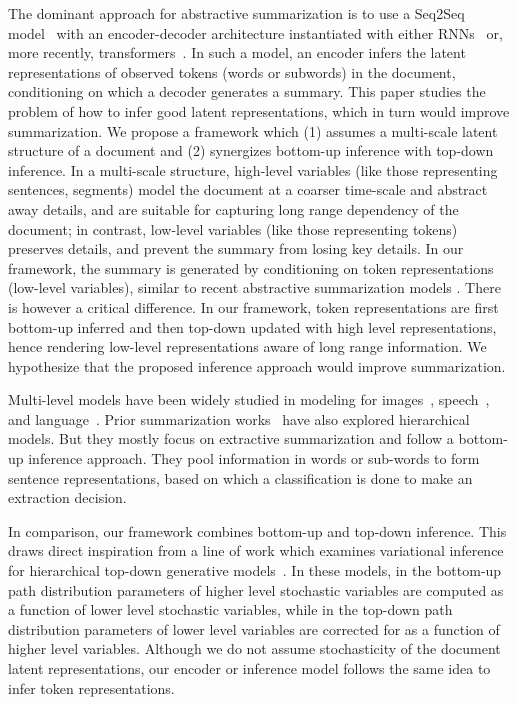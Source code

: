 The dominant approach for abstractive summarization is to use a Seq2Seq model~\citep{sutskever2014sequence} with an encoder-decoder architecture instantiated with either RNNs~\citep{hochreiter1997long} or, more recently, transformers~\citep{vaswani2017attention}. In such a model, an encoder infers the latent representations of observed tokens (words or subwords) in the document, conditioning on which a decoder generates a summary. This paper studies the problem of how to infer good latent representations, which in turn would improve summarization. We propose a framework which (1) assumes a multi-scale latent structure of a document and (2) synergizes bottom-up inference with top-down inference. In a multi-scale structure, high-level variables (like those representing sentences, segments) model the document at a coarser time-scale and abstract away details, and are suitable for capturing long range dependency of the document; in contrast, low-level variables (like those representing tokens) preserves details, and prevent the summary from losing key details. In our framework, the summary is generated by conditioning on token representations (low-level variables), similar to recent abstractive summarization models \citep{zhang2020pegasus, zaheer2020big, beltagy2020longformer}. There is however a critical difference. In our framework, token representations are first bottom-up inferred and then top-down updated with high level representations, hence rendering low-level representations aware of long range information. We hypothesize that the proposed inference approach would improve summarization.

Multi-level models have been widely studied in modeling for images~\citep{sonderby2016ladder}, speech~\citep{mehri2016samplernn}, and language~\citep{chung2016hierarchical}. Prior summarization works~\citep{cheng-lapata-2016-neural, nallapati2016abstractive, zhang-etal-2019-hibert, xu-etal-2020-unsupervised} have also explored hierarchical models. But they mostly focus on extractive summarization and follow a bottom-up inference approach. They pool information in words or sub-words to form sentence representations, based on which a classification is done to make an extraction decision. 

In comparison, our framework combines bottom-up and top-down inference. This draws direct inspiration from a line of work which examines variational inference for hierarchical top-down generative models~\citep{sonderby2016ladder, maaloe2019biva, child2020very}. In these models, in the bottom-up path distribution parameters of higher level stochastic variables are computed as a function of lower level stochastic variables, while in the top-down path distribution parameters of lower level variables are corrected for as a function of higher level variables. Although we do not assume stochasticity of the document latent representations, our encoder or inference model follows the same idea to infer token representations. 

